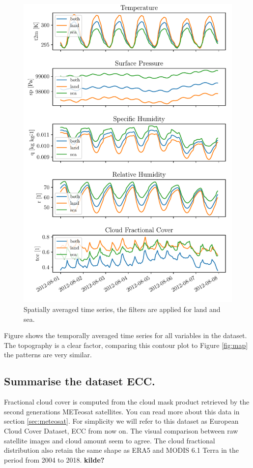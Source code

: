 \begin{figure}[ht]
    \centering
    \includegraphics{python_figs/spatially_averaged_one_week_from_2012-08-01.pdf}
    \caption{Spatially averaged time series, the filters are applied for land and sea.}
    \label{fig:random_week}
\end{figure}

Figure %
shows the temporally averaged time series for all variables in the dataset. The topography is a clear factor, comparing this contour plot to Figure \ref{fig:map} the patterns are very similar. 



\subsection{Summarise the dataset ECC.}
Fractional cloud cover is computed from the cloud mask product retrieved by the second generations METeosat satellites. You can read more about this data in section \ref{sec:meteosat}. For simplicity we will refer to this dataset as European Cloud Cover Dataset, ECC from now on. The visual comparison between raw satellite images and cloud amount seem to agree. The cloud fractional distribution also retain the same shape as ERA5 and MODIS 6.1 Terra in the period from 2004 to 2018. \textbf{kilde?}

